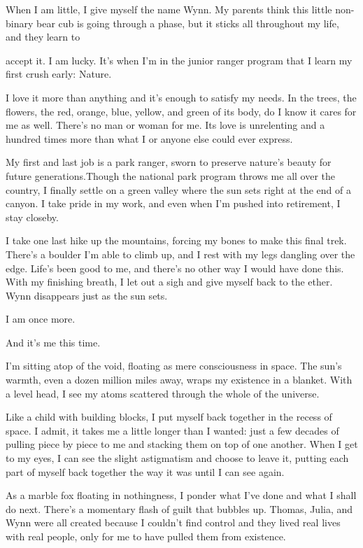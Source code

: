 When I am little, I give myself the name Wynn. My parents think this
little non-binary bear cub is going through a phase, but it sticks all
throughout my life, and they learn to

accept it. I am lucky. It's when I'm in the junior ranger program that I
learn my first crush early: Nature.

I love it more than anything and it's enough to satisfy my needs. In the
trees, the flowers, the red, orange, blue, yellow, and green of its
body, do I know it cares for me as well. There's no man or woman for me.
Its love is unrelenting and a hundred times more than what I or anyone
else could ever express.

My first and last job is a park ranger, sworn to preserve nature's
beauty for future generations.Though the national park program throws me
all over the country, I finally settle on a green valley where the sun
sets right at the end of a canyon. I take pride in my work, and even
when I'm pushed into retirement, I stay closeby.

I take one last hike up the mountains, forcing my bones to make this
final trek. There's a boulder I'm able to climb up, and I rest with my
legs dangling over the edge. Life's been good to me, and there's no
other way I would have done this. With my finishing breath, I let out a
sigh and give myself back to the ether. Wynn disappears just as the sun
sets.

I am once more.

And it's me this time.

I'm sitting atop of the void, floating as mere consciousness in space.
The sun's warmth, even a dozen million miles away, wraps my existence in
a blanket. With a level head, I see my atoms scattered through the whole
of the universe.

Like a child with building blocks, I put myself back together in the
recess of space. I admit, it takes me a little longer than I wanted:
just a few decades of pulling piece by piece to me and stacking them on
top of one another. When I get to my eyes, I can see the slight
astigmatism and choose to leave it, putting each part of myself back
together the way it was until I can see again.

As a marble fox floating in nothingness, I ponder what I've done and
what I shall do next. There's a momentary flash of guilt that bubbles
up. Thomas, Julia, and Wynn were all created because I couldn't find
control and they lived real lives with real people, only for me to have
pulled them from existence.

